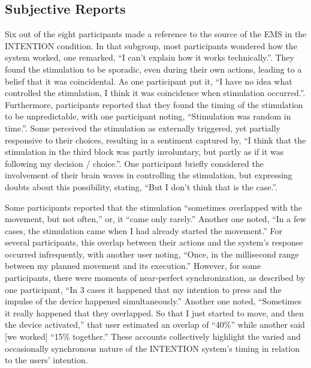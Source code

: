 \subsection{Subjective Reports}
Six out of the eight participants made a reference to the source of the EMS in the INTENTION condition. In that subgroup, most participants wondered how the system worked, one remarked, ``I can't explain how it works technically.''. They found the stimulation to be sporadic, even during their own actions, leading to a belief that it was coincidental. As one participant put it, ``I have no idea what controlled the stimulation, I think it was coincidence when stimulation occurred.''. Furthermore, participants reported that they found the timing of the stimulation to be unpredictable, with one participant noting, ``Stimulation was random in time.''. Some perceived the stimulation as externally triggered, yet partially responsive to their choices, resulting in a sentiment captured by, ``I think that the stimulation in the third block was partly involuntary, but partly as if it was following my decision / choice.''. One participant briefly considered the involvement of their brain waves in controlling the stimulation, but expressing doubts about this possibility, stating, ``But I don't think that is the case.''.

Some participants reported that the stimulation ``sometimes overlapped with the movement, but not often,'' or, it ``came only rarely.'' Another one noted, ``In a few cases, the stimulation came when I had already started the movement.'' For several participants, this overlap between their actions and the system's response occurred infrequently, with another user noting, ``Once, in the millisecond range between my planned movement and its execution.'' However, for some participants, there were moments of near-perfect synchronization, as described by one participant, ``In 3 cases it happened that my intention to press and the impulse of the device happened simultaneously.'' Another one noted, ``Sometimes it really happened that they overlapped. So that I just started to move, and then the device activated,'' that user estimated an overlap of ``40\%'' while another said [we worked] ``15\% together.'' These accounts collectively highlight the varied and occasionally synchronous nature of the  INTENTION system's timing in relation to the users' intention.

